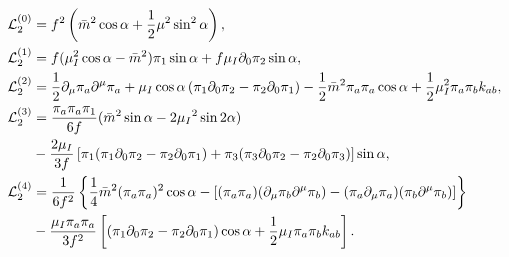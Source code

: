 \begin{align}
\mathcal{L}_2^{(0)}
&  =
    f^2   
    \left(
        \bar m^2 \cos{\alpha}
        + \frac{1}{2} \mu^2 \sin^2{\alpha}
    \right),
    \label{L0}
\\
\label{L1}
\mathcal{L}_2^{(1)}
& =
    f 
    (
        \mu_I^2\cos{\alpha}
        - \bar m^2
    ) \pi_1 \sin{\alpha}
    + f \mu_I \partial_0\pi_2 \sin{\alpha},
\\
\mathcal{L}_2^{(2)}
& =
    \frac{1}{2} \partial_\mu\pi_a\partial^\mu\pi_a
    + \mu_I \cos{\alpha} \left( \pi_1 \partial_0\pi_2 - \pi_2\partial_0\pi_1 \right)
    - \frac{1}{2} \bar m^2 \pi_a \pi_a \cos{\alpha}
    + \frac{1}{2} \mu_I ^2 \pi_a \pi_b k_{ab},
\label{L2}
\\
\notag
\mathcal{L}_2^{(3)}
& =
    \frac{\pi_a\pi_a \pi_1}{6f}
    (\bar m^2 \sin{\alpha}-2\mu_I{}^2 \sin{2\alpha})\\ \label{L3}
    &
    -
    \frac{2 \mu_I}{3 f}
    \left[
        \pi_1(\pi_1 \partial_0\pi_2 - \pi_2\partial_0\pi_1)
        +
        \pi_3(\pi_3\partial_0\pi_2-\pi_2 \partial_0\pi_3)
    \right]
    \sin{\alpha},
\\
\notag
\mathcal{L}_2^{(4)}
& =
\frac{1}{6f^2}
\left\{     
    \frac{1}{4} \bar m^2 (\pi_a\pi_a)^2 \cos{\alpha}
    -
    \left[
        (\pi_a \pi_a) (\partial_\mu \pi_b \partial^\mu \pi_b )
        - (\pi_a \partial_\mu \pi_a)(\pi_b \partial^\mu \pi_b )
    \right]
 \right\}
\\
&
- \frac{\mu_I \pi_a\pi_a}{3f^2}
\left[
    \left(\pi_1\partial_0 \pi_2 - \pi_2 \partial_0 \pi_1\right)
    \cos{\alpha}
    + \frac{1}{2} \mu_I \pi_a \pi_b k_{ab}
\right].
\label{L4}
\end{align}
